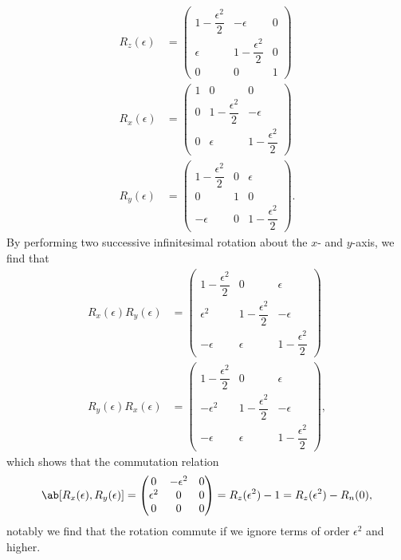 \begin{align}
    R_z(\epsilon) &= 
        \begin{pmatrix}
            1 - \dfrac{\epsilon^2}{2}    & -\epsilon                 & 0 \\
            \epsilon                    & 1 - \dfrac{\epsilon^2}{2}  & 0 \\
            0                           & 0                         & 1
        \end{pmatrix}\\
    R_x(\epsilon) &= 
        \begin{pmatrix}
            1 & 0                           & 0 \\
            0 & 1 - \dfrac{\epsilon^2}{2}    & -\epsilon \\
            0 & \epsilon                    & 1 - \dfrac{\epsilon^2}{2}      
        \end{pmatrix}\\
    R_y(\epsilon) &=
        \begin{pmatrix}
            1 - \dfrac{\epsilon^2}{2}    & 0 & \epsilon \\
            0                           & 1 & 0 \\
            -\epsilon                   & 0 & 1 - \dfrac{\epsilon^2}{2}      
        \end{pmatrix}.
\end{align}
By performing two successive infinitesimal rotation about the $x$- and $y$-axis, we find that
\begin{align}
    R_x(\epsilon) R_y(\epsilon) &=
        \begin{pmatrix}
            1 - \dfrac{\epsilon^2}{2}    & 0 & \epsilon \\
            \epsilon^2                    & 1 - \dfrac{\epsilon^2}{2}    & -\epsilon \\
            -\epsilon                   & \epsilon                    & 1 - \dfrac{\epsilon^2}{2}      
        \end{pmatrix}\\
    R_y(\epsilon) R_x(\epsilon) &=
        \begin{pmatrix}
            1 - \dfrac{\epsilon^2}{2}    & 0 & \epsilon \\
            -\epsilon^2                   & 1 - \dfrac{\epsilon^2}{2}    & -\epsilon \\
            -\epsilon                   & \epsilon                    & 1 - \dfrac{\epsilon^2}{2}      
        \end{pmatrix},
\end{align}
which shows that the commutation relation
\begin{equation}
    \comm{R_x(\epsilon)}{R_y(\epsilon)} = 
        \begin{pmatrix}
            0 & -\epsilon^2 & 0\\
            \epsilon^2 & 0 & 0\\
            0 & 0 & 0
        \end{pmatrix}
        = R_z(\epsilon^2) - 1 = R_z(\epsilon^2) - R_n(0),
\end{equation}
notably we find that the rotation commute if we ignore terms of order $\epsilon^2$ and higher.

